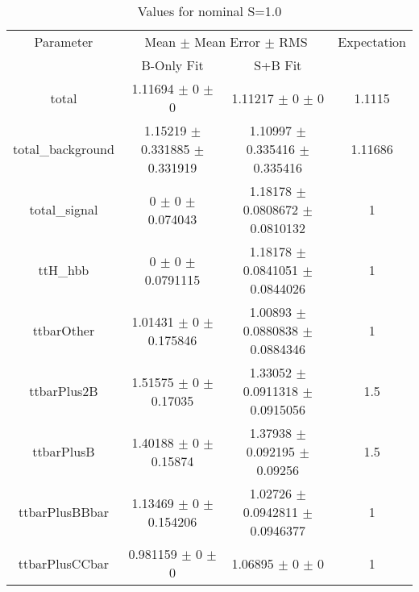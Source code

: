 \begin{table}
\centering
\caption{Values for nominal S=1.0}
\begin{tabular}{cccc}
\toprule
Parameter & \multicolumn{2}{c}{Mean $\pm$ Mean Error $\pm$ RMS} & Expectation\\
 & B-Only Fit & S+B Fit & \\
\midrule
total & \num{1.11694} $\pm$ \num{0} $\pm$ \num{0} & \num{1.11217} $\pm$ \num{0} $\pm$ \num{0} & \num{1.1115}\\
total\_background & \num{1.15219} $\pm$ \num{0.331885} $\pm$ \num{0.331919} & \num{1.10997} $\pm$ \num{0.335416} $\pm$ \num{0.335416} & \num{1.11686}\\
total\_signal & \num{0} $\pm$ \num{0} $\pm$ \num{0.074043} & \num{1.18178} $\pm$ \num{0.0808672} $\pm$ \num{0.0810132} & \num{1}\\
ttH\_hbb & \num{0} $\pm$ \num{0} $\pm$ \num{0.0791115} & \num{1.18178} $\pm$ \num{0.0841051} $\pm$ \num{0.0844026} & \num{1}\\
ttbarOther & \num{1.01431} $\pm$ \num{0} $\pm$ \num{0.175846} & \num{1.00893} $\pm$ \num{0.0880838} $\pm$ \num{0.0884346} & \num{1}\\
ttbarPlus2B & \num{1.51575} $\pm$ \num{0} $\pm$ \num{0.17035} & \num{1.33052} $\pm$ \num{0.0911318} $\pm$ \num{0.0915056} & \num{1.5}\\
ttbarPlusB & \num{1.40188} $\pm$ \num{0} $\pm$ \num{0.15874} & \num{1.37938} $\pm$ \num{0.092195} $\pm$ \num{0.09256} & \num{1.5}\\
ttbarPlusBBbar & \num{1.13469} $\pm$ \num{0} $\pm$ \num{0.154206} & \num{1.02726} $\pm$ \num{0.0942811} $\pm$ \num{0.0946377} & \num{1}\\
ttbarPlusCCbar & \num{0.981159} $\pm$ \num{0} $\pm$ \num{0} & \num{1.06895} $\pm$ \num{0} $\pm$ \num{0} & \num{1}\\
\bottomrule
\end{tabular}
\end{table}